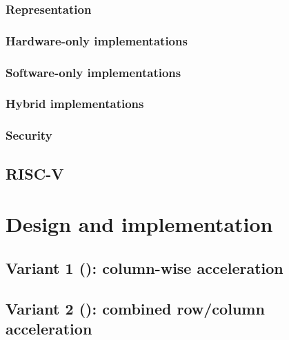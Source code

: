 \documentclass[preprint]{iacrtrans}
\begin{document}
\subsubsection{Representation}
\label{sec:bg:aes_impl_rep}


\subsubsection{Hardware-only implementations}
\label{sec:bg:aes_impl_hw}

\subsubsection{Software-only implementations}
\label{sec:bg:aes_impl_sw}

\subsubsection{Hybrid        implementations}
\label{sec:bg:aes_impl_ise}


\subsubsection{Security}
\label{sec:bg:aes_impl_sec}



\subsection{RISC-V}
\label{sec:bg:riscv}



\section{Design and implementation}
\label{sec:design}



\subsection{Variant 1 (): column-wise acceleration}
\label{sec:design:v1}


\subsection{Variant 2 (): combined row/column acceleration}
\label{sec:design:v2}

\end{document}
